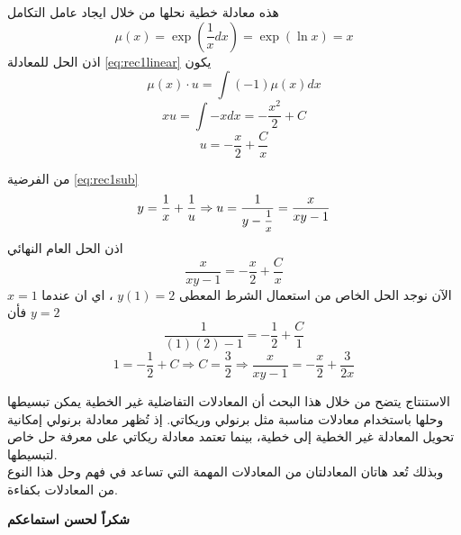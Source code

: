 			\begin{frame}
				هذه معادلة خطية نحلها من خلال ايجاد عامل التكامل
				\[
				\mu(x) = \exp\left(\frac{1}{x} dx\right) = \exp(\ln x) =x
				\]
				اذن الحل للمعادلة \eqref{eq:rec1linear} يكون 
				\[
				\mu(x)\cdot u = \int (-1) \mu(x) dx
				\]
				\[
				xu = \int -x dx = -\frac{x^2}{2} + C
				\]
				\[
				u = -\frac{x}{2} + \frac{C}{x}
				\]
			\end{frame}
			
			\begin{frame}
				
				من الفرضية \eqref{eq:rec1sub} 
				\[
				y = \frac{1}{x} + \frac{1}{u} \Rightarrow u = \frac{1}{y-\mfrac{1}{x}} = \frac{x}{xy-1}
				\]
				اذن الحل العام النهائي
				\[
				\frac{x}{xy-1} = -\frac{x}{2} + \frac{C}{x}
				\]
				الآن نوجد الحل الخاص من استعمال الشرط المعطى 
				$y(1)=2$ ، اي ان عندما $x=1$ فأن $y=2$
				\[
				\frac{1}{(1)(2)-1} = -\frac{1}{2} + \frac{C}{1}
				\]
				\[
				1 = -\frac{1}{2} + C \Rightarrow \boxed{C = \frac{3}{2}} \Rightarrow \frac{x}{xy-1} = -\frac{x}{2} + \frac{3}{2x} 
				\]
			\end{frame}
			
			\begin{frame}{الاستنتاج}
				يتضح من خلال هذا البحث أن المعادلات التفاضلية غير الخطية يمكن تبسيطها وحلها باستخدام معادلات مناسبة مثل برنولي وريكاتي. إذ تُظهر معادلة برنولي إمكانية تحويل المعادلة غير الخطية إلى خطية، بينما تعتمد معادلة ريكاتي على معرفة حل خاص لتبسيطها. \\
				وبذلك تُعد هاتان المعادلتان من المعادلات المهمة التي تساعد في فهم وحل هذا النوع من المعادلات بكفاءة.
			\end{frame}
			
			\begin{frame}
				\begin{center}
					\Huge
					\textbf{شكراً لحسن استماعكم}
				\end{center}
			\end{frame}
			
			
